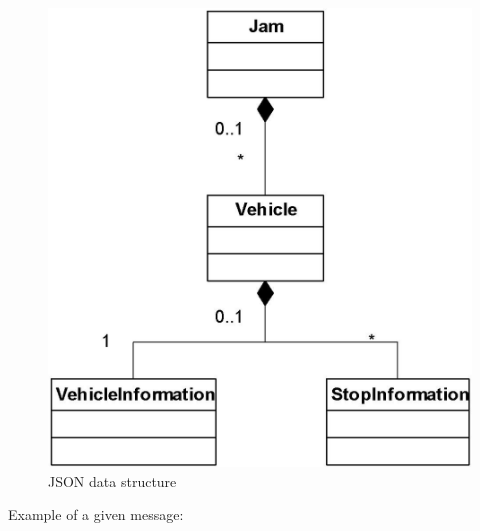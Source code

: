 \begin{figure}[htbp]
\centering
\includegraphics[width=0.5 \textwidth]{img/tjd/data_structure.jpg}
\caption{JSON data structure}\label{fig:tjd_datastructure}
\end{figure}

Example of a given message:

